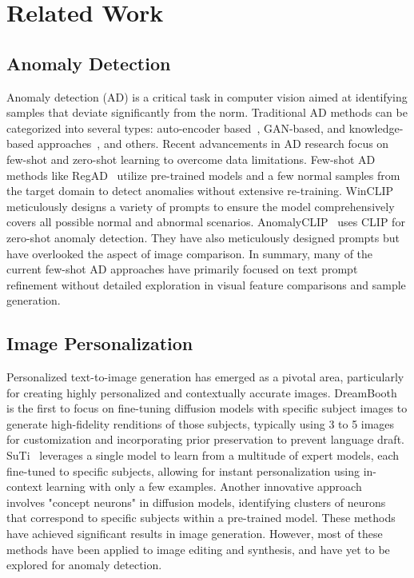 \section{Related Work}
\label{related_work}
\subsection{Anomaly Detection}
Anomaly detection (AD) is a critical task in computer vision aimed at identifying samples that deviate significantly from the norm. Traditional AD methods can be categorized into several types:  auto-encoder based~\cite{zhou2020encoding,zavrtanik2021reconstruction}, GAN-based, and knowledge-based approaches~\cite{cao2023anomaly,deng2022anomaly,tien2023revisiting}, and others. Recent advancements in AD research focus on few-shot and zero-shot learning to overcome data limitations. Few-shot AD methods like RegAD~\cite{huang2022registration} utilize pre-trained models and a few normal samples from the target domain to detect anomalies without extensive re-training. WinCLIP~\cite{jeong2023winclip} meticulously designs a variety of prompts to ensure the model comprehensively covers all possible normal and abnormal scenarios. AnomalyCLIP~\cite{zhou2023anomalyclip} uses CLIP for zero-shot anomaly detection. They have also meticulously designed prompts but have overlooked the aspect of image comparison. In summary, many of the current few-shot AD approaches have primarily focused on text prompt refinement without detailed exploration in visual feature comparisons and sample generation.

\subsection{Image Personalization}
Personalized text-to-image generation has emerged as a pivotal area, particularly for creating highly personalized and contextually accurate images. DreamBooth~\cite{ruiz2023dreambooth} is the first to focus on fine-tuning diffusion models with specific subject images to generate high-fidelity renditions of those subjects, typically using 3 to 5 images for customization and incorporating prior preservation to prevent language draft. SuTi~\cite{chen2024subject} leverages a single model to learn from a multitude of expert models, each fine-tuned to specific subjects, allowing for instant personalization using in-context learning with only a few examples. Another innovative approach~\cite{liu2023cones} involves "concept neurons" in diffusion models, identifying clusters of neurons that correspond to specific subjects within a pre-trained model. These methods have achieved significant results in image generation. However, most of these methods have been applied to image editing and synthesis, and have yet to be explored for anomaly detection.

